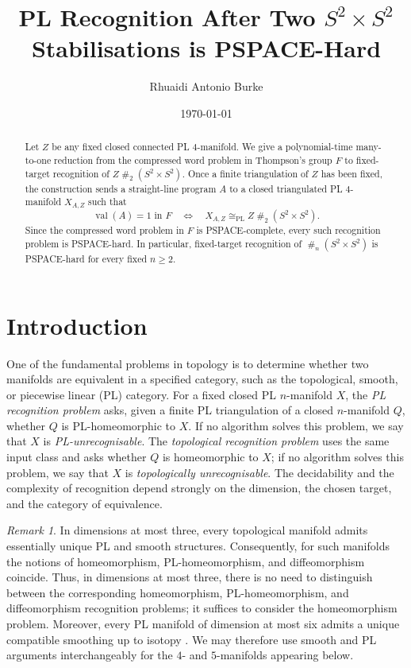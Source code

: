 \documentclass[a4paper,11pt,reqno]{amsart}
\title{PL Recognition After Two $S^{2}\times S^{2}$ Stabilisations is PSPACE-Hard}
\author{Rhuaidi Antonio Burke}
\date{\today}
\theoremstyle{definition}
\theoremstyle{remark}
\newtheorem{remark}{Remark}
\DeclareMathOperator{\val}{val}
\newcommand{\PL}{\mathrm{PL}}
\newcommand{\cs}{\mathbin{\#}}
\begin{document}
	
	\begin{abstract}
		Let $Z$ be any fixed closed connected PL $4$-manifold. We give a
		polynomial-time many-to-one reduction from the compressed word problem in
		Thompson's group $F$ to fixed-target recognition of
		$Z\cs_{2}(S^{2}\times S^{2})$. 
		Once a finite triangulation of $Z$ has been fixed, the construction sends a straight-line program $A$ to a closed triangulated PL $4$-manifold $X_{A,Z}$ such that
		\[
		\val(A)=1\text{ in }F
		\quad\Longleftrightarrow\quad
		X_{A,Z}\cong_{\PL}Z\cs_{2}(S^{2}\times S^{2}).
		\]
		Since the compressed word problem in $F$ is PSPACE-complete, every such
		recognition problem is PSPACE-hard. 
		In particular, fixed-target recognition of $\cs_n(S^2\times S^2)$ is
		PSPACE-hard for every fixed $n\geq2$.
	\end{abstract}
	
	\vspace*{-0.5em}
	\maketitle
	
	\section{Introduction}
	\label{sec:intro}	
	One of the fundamental problems in topology is to determine whether two manifolds are equivalent in a specified category, such as the topological, smooth, or piecewise linear (PL) category. 
	For a fixed closed PL $n$-manifold $X$, the \emph{PL recognition problem} asks, given a finite PL triangulation of a closed $n$-manifold $Q$, whether $Q$ is PL-homeomorphic to $X$. 
	If no algorithm solves this problem, we say that $X$ is \emph{PL-unrecognisable}. 
	The \emph{topological recognition problem} uses the same input class and asks whether $Q$ is homeomorphic to $X$; if no algorithm solves this problem, we say that $X$ is \emph{topologically unrecognisable}. 
	The decidability and the complexity of recognition depend strongly on the dimension, the chosen target, and the category of equivalence.
	
	\begin{remark}
		In dimensions at most three, every topological manifold admits essentially unique PL and smooth structures. Consequently, for such manifolds the notions of homeomorphism, PL-homeomorphism, and diffeomorphism coincide. Thus, in dimensions at most three, there is no need to
		distinguish between the corresponding homeomorphism, PL-homeomorphism, and
		diffeomorphism recognition problems; it suffices to consider the homeomorphism problem.
		Moreover, every PL manifold of dimension at most six admits a unique compatible smoothing up to isotopy \cite{HirschMazur,Munkres-Smoothing}. We may therefore use smooth and PL arguments interchangeably for the $4$- and $5$-manifolds appearing below.
	\end{remark}
	
\end{document}
